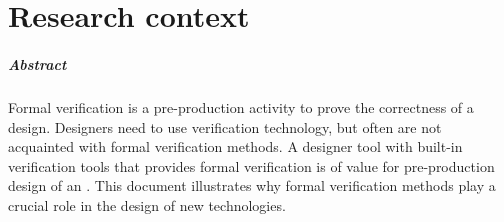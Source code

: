 \chapter{Research context}

\graphicspath{ {../05-research-context/} }
\paragraph{Abstract}
Formal verification is a pre-production activity to prove the correctness of a
design. Designers need to use verification technology, but often are not acquainted with formal verification methods.
A designer tool with built-in verification tools that provides formal verification is of value for pre-production
design of an \Noc. This document illustrates why formal verification methods play a crucial role
in the design of new technologies.  






